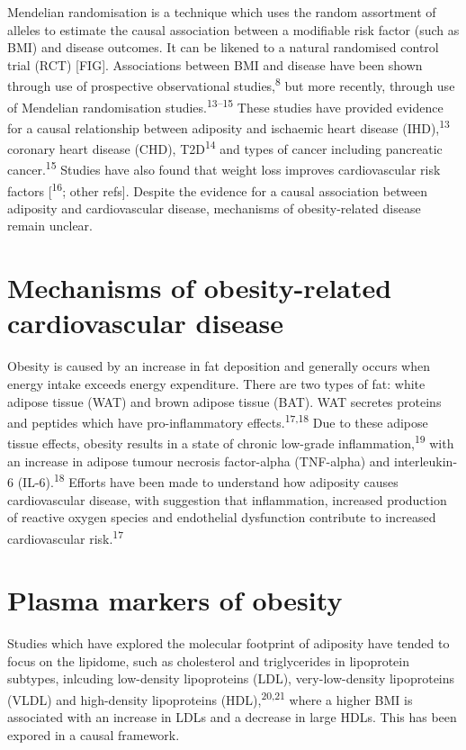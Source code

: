 \documentclass[11pt,twoside]{bristolthesis}
\begin{document}
Mendelian randomisation is a technique which uses the random assortment of alleles to estimate the causal association between a modifiable risk factor (such as BMI) and disease outcomes. It can be likened to a natural randomised control trial (RCT) {[}FIG{]}. Associations between BMI and disease have been shown through use of prospective observational studies,\textsuperscript{8} but more recently, through use of Mendelian randomisation studies.\textsuperscript{13--15} These studies have provided evidence for a causal relationship between adiposity and ischaemic heart disease (IHD),\textsuperscript{13} coronary heart disease (CHD), T2D\textsuperscript{14} and types of cancer including pancreatic cancer.\textsuperscript{15} Studies have also found that weight loss improves cardiovascular risk factors {[}\textsuperscript{16}; other refs{]}. Despite the evidence for a causal association between adiposity and cardiovascular disease, mechanisms of obesity-related disease remain unclear.

\hypertarget{mechanisms-of-obesity-related-cardiovascular-disease}{%
\section{Mechanisms of obesity-related cardiovascular disease}\label{mechanisms-of-obesity-related-cardiovascular-disease}}

Obesity is caused by an increase in fat deposition and generally occurs when energy intake exceeds energy expenditure. There are two types of fat: white adipose tissue (WAT) and brown adipose tissue (BAT). WAT secretes proteins and peptides which have pro-inflammatory effects.\textsuperscript{17,18} Due to these adipose tissue effects, obesity results in a state of chronic low-grade inflammation,\textsuperscript{19} with an increase in adipose tumour necrosis factor-alpha (TNF-alpha) and interleukin-6 (IL-6).\textsuperscript{18} Efforts have been made to understand how adiposity causes cardiovascular disease, with suggestion that inflammation, increased production of reactive oxygen species and endothelial dysfunction contribute to increased cardiovascular risk.\textsuperscript{17}

\hypertarget{plasma-markers-of-obesity}{%
\section{Plasma markers of obesity}\label{plasma-markers-of-obesity}}

Studies which have explored the molecular footprint of adiposity have tended to focus on the lipidome, such as cholesterol and triglycerides in lipoprotein subtypes, inlcuding low-density lipoproteins (LDL), very-low-density lipoproteins (VLDL) and high-density lipoproteins (HDL),\textsuperscript{20,21} where a higher BMI is associated with an increase in LDLs and a decrease in large HDLs. This has been expored in a causal framework.
\end{document}
